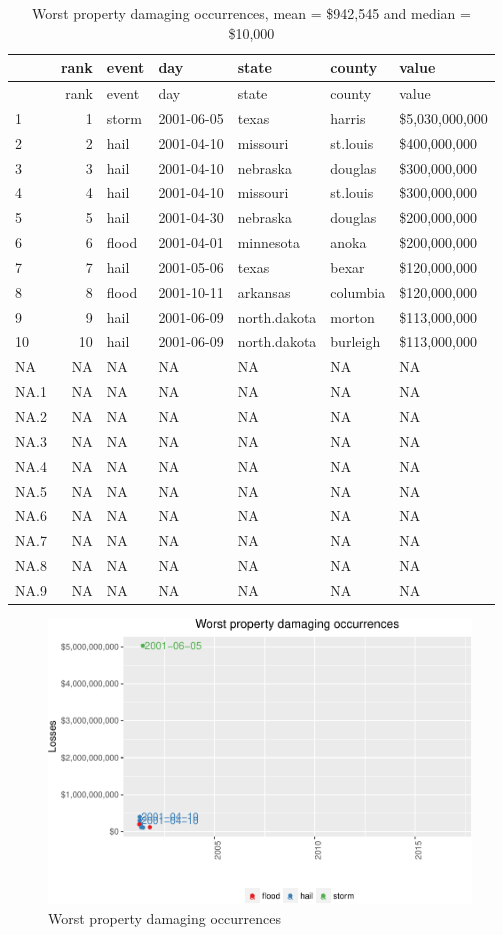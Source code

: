 \documentclass[]{article}
\begin{document}
\begin{longtable}[]{@{}lrlllll@{}}
\caption{Worst property damaging occurrences, mean = \$942,545 and
median = \$10,000}\tabularnewline
\toprule
& rank & event & day & state & county & value\tabularnewline
\midrule
\endfirsthead
\toprule
& rank & event & day & state & county & value\tabularnewline
\midrule
\endhead
1 & 1 & storm & 2001-06-05 & texas & harris &
\$5,030,000,000\tabularnewline
2 & 2 & hail & 2001-04-10 & missouri & st.louis &
\$400,000,000\tabularnewline
3 & 3 & hail & 2001-04-10 & nebraska & douglas &
\$300,000,000\tabularnewline
4 & 4 & hail & 2001-04-10 & missouri & st.louis &
\$300,000,000\tabularnewline
5 & 5 & hail & 2001-04-30 & nebraska & douglas &
\$200,000,000\tabularnewline
6 & 6 & flood & 2001-04-01 & minnesota & anoka &
\$200,000,000\tabularnewline
7 & 7 & hail & 2001-05-06 & texas & bexar & \$120,000,000\tabularnewline
8 & 8 & flood & 2001-10-11 & arkansas & columbia &
\$120,000,000\tabularnewline
9 & 9 & hail & 2001-06-09 & north.dakota & morton &
\$113,000,000\tabularnewline
10 & 10 & hail & 2001-06-09 & north.dakota & burleigh &
\$113,000,000\tabularnewline
NA & NA & NA & NA & NA & NA & NA\tabularnewline
NA.1 & NA & NA & NA & NA & NA & NA\tabularnewline
NA.2 & NA & NA & NA & NA & NA & NA\tabularnewline
NA.3 & NA & NA & NA & NA & NA & NA\tabularnewline
NA.4 & NA & NA & NA & NA & NA & NA\tabularnewline
NA.5 & NA & NA & NA & NA & NA & NA\tabularnewline
NA.6 & NA & NA & NA & NA & NA & NA\tabularnewline
NA.7 & NA & NA & NA & NA & NA & NA\tabularnewline
NA.8 & NA & NA & NA & NA & NA & NA\tabularnewline
NA.9 & NA & NA & NA & NA & NA & NA\tabularnewline
\bottomrule
\end{longtable}

\begin{figure}[htbp]
\centering
\includegraphics{readme_files/figure-latex/prop-single-plot-1.pdf}
\caption{Worst property damaging occurrences}
\end{figure}
\end{document}
